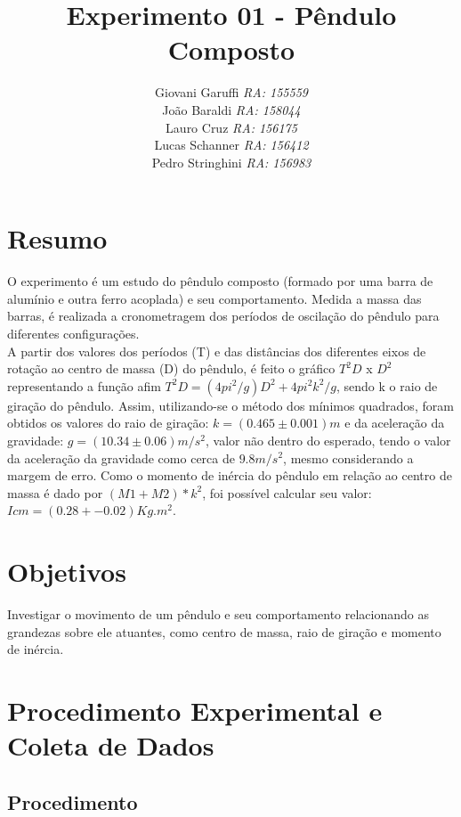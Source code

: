 \documentclass[12pt,a4paper]{article}
\begin{document}
\title{\vspace{70mm}\Huge Experimento 01 - Pêndulo Composto}
\author{ Giovani Garuffi\qquad\hfill
		\textit {RA: 155559}\protect\\
		João Baraldi\hfill
		\textit{RA: 158044}\protect\\
		Lauro Cruz\hfill
		\textit{RA: 156175}\protect\\
		Lucas Schanner\hfill
		\textit{RA: 156412}\protect\\
		Pedro Stringhini\hfill
		\textit {RA: 156983}								
		}
\maketitle
\newpage
\section{Resumo}
O experimento é um estudo do pêndulo composto (formado por uma barra de alumínio e outra ferro acoplada) e seu comportamento. Medida a massa das barras, é realizada a cronometragem dos períodos de oscilação do pêndulo para diferentes configurações.\\
A partir dos valores dos períodos (T) e das distâncias dos diferentes eixos de rotação ao centro de massa (D) do pêndulo, é feito o gráfico $T^2D$ x $D^2$ representando a função afim $T^2D = (4pi^2/g)D^2 + 4pi^2k^2/g$, sendo k o raio de giração do pêndulo. Assim, utilizando-se o método dos mínimos quadrados, foram obtidos os valores do raio de giração: $k = (0.465 \pm 0.001)m$ e da aceleração da gravidade: $g = (10.34 \pm 0.06) m/s^2$, valor não dentro do esperado, tendo o valor da aceleração da gravidade como cerca de $9.8 m/s^2$, mesmo considerando a margem de erro. Como o momento de inércia do pêndulo em relação ao centro de massa é dado por $(M1 + M2)*k^2$, foi possível calcular seu valor: $Icm = (0.28 +- 0.02)Kg.m^2$.
\section{Objetivos}
Investigar o movimento de um pêndulo e seu comportamento relacionando as grandezas sobre ele atuantes, como centro de massa, raio de giração e momento de inércia.

\section{Procedimento Experimental e Coleta de Dados}
\subsection{Procedimento}
\end{document}
